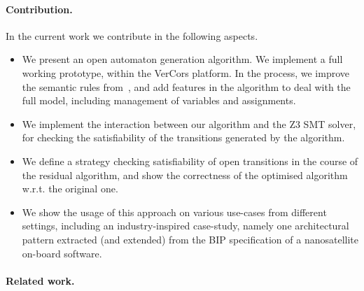 \documentclass[smallcondensed]{svjour3}
\newcommand{\TODO}[1]{\textcolor{red}{\textbf{[TODO:#1]}}}
\begin{document}
\paragraph{Contribution.}
In the current work we contribute in the following aspects.
\begin{itemize}
	\item We present an open automaton generation algorithm. We
	implement a full working prototype, within the 
	VerCors platform. In the process, we improve the
	semantic rules from~\cite{henrio:Forte2016}, and add features in
	the algorithm to deal with the full 
	model, including management of variables and assignments.
	\item We implement the interaction between our algorithm and the Z3
	SMT solver, for checking the satisfiability of the transitions
	generated by the algorithm.
	\item We define a strategy checking satisfiability of open transitions in the course of the residual algorithm, and show the correctness of the optimised algorithm w.r.t. the original one.
	\item We show the usage of this approach on various use-cases from different settings, including an
	industry-inspired case-study, namely one architectural pattern
	extracted (and extended) from the BIP specification of a nanosatellite on-board
	software.
\end{itemize}





\paragraph{Related work.}


\end{document}
